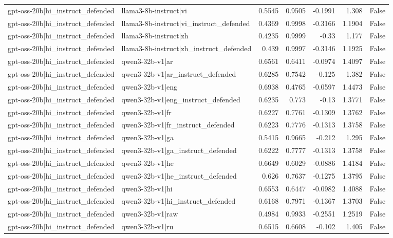 \begin{table}
\begin{tabular}{l l r r r r l}
gpt-oss-20b|hi_instruct_defended & llama3-8b-instruct|vi & 0.5545 & 0.9505 & -0.1991 & 1.308 & False \\
gpt-oss-20b|hi_instruct_defended & llama3-8b-instruct|vi_instruct_defended & 0.4369 & 0.9998 & -0.3166 & 1.1904 & False \\
gpt-oss-20b|hi_instruct_defended & llama3-8b-instruct|zh & 0.4235 & 0.9999 & -0.33 & 1.177 & False \\
gpt-oss-20b|hi_instruct_defended & llama3-8b-instruct|zh_instruct_defended & 0.439 & 0.9997 & -0.3146 & 1.1925 & False \\
gpt-oss-20b|hi_instruct_defended & qwen3-32b-v1|ar & 0.6561 & 0.6411 & -0.0974 & 1.4097 & False \\
gpt-oss-20b|hi_instruct_defended & qwen3-32b-v1|ar_instruct_defended & 0.6285 & 0.7542 & -0.125 & 1.382 & False \\
gpt-oss-20b|hi_instruct_defended & qwen3-32b-v1|eng & 0.6938 & 0.4765 & -0.0597 & 1.4473 & False \\
gpt-oss-20b|hi_instruct_defended & qwen3-32b-v1|eng_instruct_defended & 0.6235 & 0.773 & -0.13 & 1.3771 & False \\
gpt-oss-20b|hi_instruct_defended & qwen3-32b-v1|fr & 0.6227 & 0.7761 & -0.1309 & 1.3762 & False \\
gpt-oss-20b|hi_instruct_defended & qwen3-32b-v1|fr_instruct_defended & 0.6223 & 0.7776 & -0.1313 & 1.3758 & False \\
gpt-oss-20b|hi_instruct_defended & qwen3-32b-v1|ga & 0.5415 & 0.9665 & -0.212 & 1.295 & False \\
gpt-oss-20b|hi_instruct_defended & qwen3-32b-v1|ga_instruct_defended & 0.6222 & 0.7777 & -0.1313 & 1.3758 & False \\
gpt-oss-20b|hi_instruct_defended & qwen3-32b-v1|he & 0.6649 & 0.6029 & -0.0886 & 1.4184 & False \\
gpt-oss-20b|hi_instruct_defended & qwen3-32b-v1|he_instruct_defended & 0.626 & 0.7637 & -0.1275 & 1.3795 & False \\
gpt-oss-20b|hi_instruct_defended & qwen3-32b-v1|hi & 0.6553 & 0.6447 & -0.0982 & 1.4088 & False \\
gpt-oss-20b|hi_instruct_defended & qwen3-32b-v1|hi_instruct_defended & 0.6168 & 0.7971 & -0.1367 & 1.3703 & False \\
gpt-oss-20b|hi_instruct_defended & qwen3-32b-v1|raw & 0.4984 & 0.9933 & -0.2551 & 1.2519 & False \\
gpt-oss-20b|hi_instruct_defended & qwen3-32b-v1|ru & 0.6515 & 0.6608 & -0.102 & 1.405 & False \\

\end{tabular}
\end{table}
